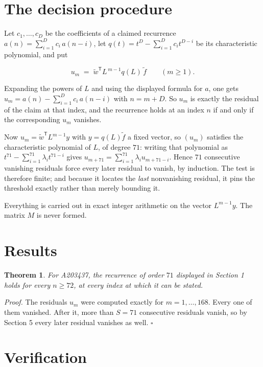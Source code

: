 \documentclass[11pt]{article}
\newtheorem{theorem}{Theorem}
\theoremstyle{definition}
\begin{document}
\section{The decision procedure}

Let $c_1,\dots,c_D$ be the coefficients of a claimed recurrence $a(n) = \sum_{i=1}^{D} c_i\,a(n-i)$, let $q(t) = t^{D} - \sum_{i=1}^{D} c_i t^{D-i}$ be its characteristic polynomial, and put

\[u_m \;=\; \tilde w^{\mathsf T} L^{\,m-1} q(L)\,\tilde f \qquad (m \ge 1).\]

Expanding the powers of $L$ and using the displayed formula for $a$, one gets $u_m = a(n) - \sum_{i=1}^{D} c_i\,a(n-i)$ with $n = m + D$. So $u_m$ is exactly the residual of the claim at that index, and the recurrence holds at an index $n$ if and only if the corresponding $u_m$ vanishes.

Now $u_m = \tilde w^{\mathsf T} L^{m-1} y$ with $y = q(L)\tilde f$ a fixed vector, so $(u_m)$ satisfies the characteristic polynomial of $L$, of degree $71$: writing that polynomial as $t^{71} - \sum_{i=1}^{71} \lambda_i t^{71-i}$ gives $u_{m+71} = \sum_{i=1}^{71} \lambda_i u_{m+71-i}$. Hence $71$ consecutive vanishing residuals force every later residual to vanish, by induction. The test is therefore finite; and because it locates the {\itshape last} nonvanishing residual, it pins the threshold exactly rather than merely bounding it.

Everything is carried out in exact integer arithmetic on the vector $L^{m-1}y$. The matrix $M$ is never formed.

\section{Results}

\begin{theorem} For A203437, the recurrence of order $71$ displayed in Section 1 holds for every $n \ge 72$, at every index at which it can be stated.\end{theorem}

{\itshape Proof.} The residuals $u_m$ were computed exactly for $m = 1,\dots,168$. Every one of them vanished. After it, more than $S = 71$ consecutive residuals vanish, so by Section 5 every later residual vanishes as well. $\square$

\section{Verification}
\end{document}
